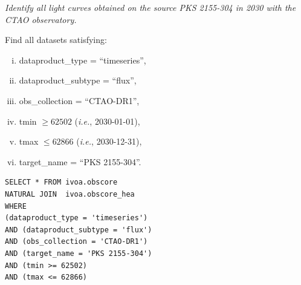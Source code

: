{\em Identify all light curves obtained on the source PKS 2155-304 in 2030 with the CTAO observatory.\/}

\medskip
\noindent Find all datasets satisfying:
\begin{enumerate}[(i)]
  \item dataproduct\_type = ``timeseries'',
  \item dataproduct\_subtype = ``flux'',
  \item obs\_collection = ``CTAO-DR1'',
  \item tmin $\geq 62502$ ({\em i.e.\/}, 2030-01-01),
  \item tmax $\leq 62866$ ({\em i.e.\/}, 2030-12-31),
  \item target\_name = ``PKS 2155-304''.
\end{enumerate}

\begin{verbatim}
SELECT * FROM ivoa.obscore
NATURAL JOIN  ivoa.obscore_hea
WHERE
(dataproduct_type = 'timeseries')
AND (dataproduct_subtype = 'flux')
AND (obs_collection = 'CTAO-DR1')
AND (target_name = 'PKS 2155-304')
AND (tmin >= 62502)
AND (tmax <= 62866)
\end{verbatim}
